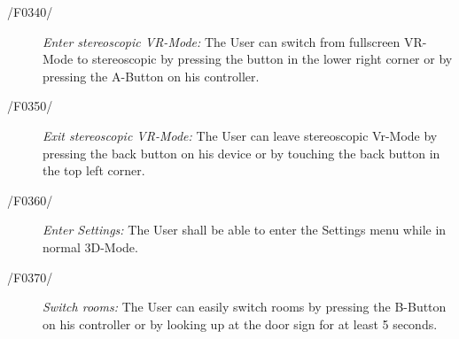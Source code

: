 \begin{description}
  \item[/F0340/]
    \textit{Enter stereoscopic VR-Mode:} The User can switch from fullscreen VR-Mode to stereoscopic by pressing the button in the lower right corner or by pressing the A-Button on his controller.
\end{description}

\begin{description}
  \item[/F0350/]
    \textit{Exit stereoscopic VR-Mode:} The User can leave stereoscopic Vr-Mode by pressing the back button on his device or by touching the back button in the top left corner.
\end{description}

\begin{description}
  \item[/F0360/]
    \textit{Enter Settings:} The User shall be able to enter the Settings menu while in normal 3D-Mode.
\end{description}

\begin{description}
  \item[/F0370/]
    \textit{Switch rooms:} The User can easily switch rooms by pressing the B-Button on his controller or by looking up at the door sign for at least 5 seconds.
\end{description}
